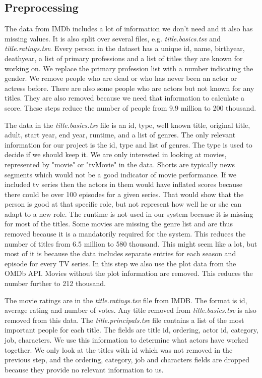 \subsection{Preprocessing}

The data from IMDb includes a lot of information we don’t need and it also has missing values. It is also split over several files, e.g. \textit{title.basics.tsv} and \textit{title.ratings.tsv}. Every person in the dataset has a unique id, name, birthyear, deathyear, a list of primary professions and a list of titles they are known for working on. We replace the primary profession list with a number indicating the gender. We remove people who are dead or who has never been an actor or actress before. There are also some people who are actors but not known for any titles. They are also removed because we need that information to calculate a score. These steps reduce the number of people from 9.9 million to 200 thousand.

The data in the \textit{title.basics.tsv} file is an id, type, well known title, original title, adult, start year, end year, runtime, and a list of genres. The only relevant information for our project is the id, type and list of genres. The type is used to decide if we should keep it. We are only interested in looking at movies, represented by "movie" or "tvMovie" in the data. Shorts are typically news segments which would not be a good indicator of movie performance. If we included tv series then the actors in them would have inflated scores because there could be over 100 episodes for a given series. That would show that the person is good at that specific role, but not represent how well he or she can adapt to a new role. The runtime is not used in our system because it is missing for most of the titles. Some movies are missing the genre list and are thus removed because it is a mandatorily required for the system. This reduces the number of titles from 6.5 million to 580 thousand. This might seem like a lot, but most of it is because the data includes separate entries for each season and episode for every TV series. In this step we also use the plot data from the OMDb API. Movies without the plot information are removed. This reduces the number further to 212 thousand.

The movie ratings are in the \textit{title.ratings.tsv} file from IMDB. The format is id, average rating and number of votes. Any title removed from \textit{title.basics.tsv} is also removed from this data. The \textit{title.principals.tsv} file contains a list of the most important people for each title. The fields are title id, ordering, actor id, category, job, characters. We use this information to determine what actors have worked together. We only look at the titles with id which was not removed in the previous step, and the ordering, category, job and characters fields are dropped because they provide no relevant information to us.



